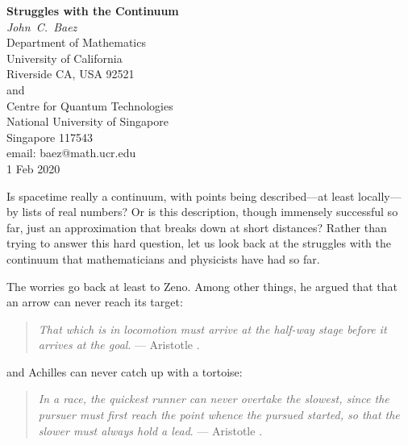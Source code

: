 \documentclass[12pt]{article}
\begin{document}


\begin{center}   
  {\bf Struggles with the Continuum \\}   
  \vspace{0.3cm}
  {\em John\ C.\ Baez \\}
  \vspace{0.3cm}
  {\small
 Department of Mathematics \\
    University of California \\
  Riverside CA, USA 92521 \\ and \\
 Centre for Quantum Technologies  \\
    National University of Singapore \\
    Singapore 117543  \\    } 
  \vspace{0.3cm}   
  {\small email:  baez@math.ucr.edu \\} 
  \vspace{0.3cm}   
  {\small {1 Feb 2020}}
  \vspace{0.3cm}   
\end{center}   

Is spacetime really a continuum, with points being described---at least locally---by lists of  real numbers?  Or is this description, though immensely successful so far, just an approximation that breaks down at short distances?  Rather than trying to answer this hard question, let us look back at the struggles with the continuum that mathematicians and physicists have had so far.

The worries go back at least to Zeno.  Among other things, he argued that that an arrow can never reach its target:

\begin{quote}
\emph{That which is in locomotion must arrive at the half-way stage before it arrives at the goal}. ---  Aristotle \cite{AristotleZeno1}.
\end{quote}

\noindent
and Achilles can never catch up with a tortoise:

\begin{quote}
\emph{In a race, the quickest runner can never overtake the slowest, since the pursuer must first reach the point whence the pursued started, so that the slower must always hold a lead}. --- Aristotle \cite{AristotleZeno2}.
\end{quote}
\end{document}
